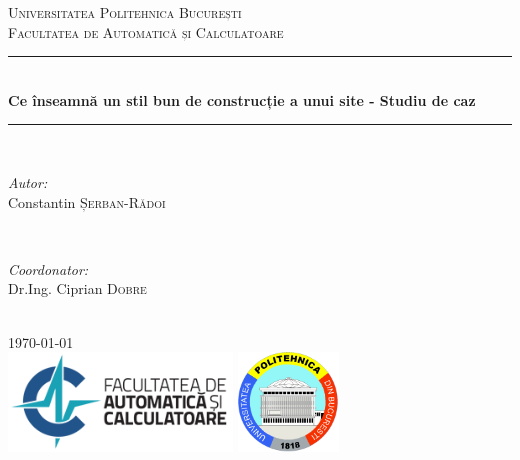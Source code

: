 \documentclass[12pt]{article} %
\begin{document}

\begin{titlepage}

\newcommand{\HRule}{\rule{\linewidth}{0.5mm}} %

\center %

\textsc{\LARGE Universitatea Politehnica București}\\[1.5cm] %
\textsc{\Large Facultatea de Automatică și Calculatoare}\\[0.5cm] %

\HRule \\[0.4cm]
{ \huge \bfseries Ce înseamnă un stil bun de construcție a unui site - Studiu de caz}\\[0.4cm] %
\HRule \\[1.5cm]

\begin{minipage}{0.4\textwidth}
\begin{flushleft} \large
\emph{Autor:}\\
Constantin \textsc{Șerban-Rădoi} %
\end{flushleft}
\end{minipage}
~
\begin{minipage}{0.4\textwidth}
\begin{flushright} \large
\emph{Coordonator:} \\
Dr.Ing. Ciprian \textsc{Dobre} %
\end{flushright}
\end{minipage}\\[4cm]

{\large \today}\\[3cm] %

\includegraphics[height=100px]{logo-acs-text} %
\includegraphics[height=100px]{logo-upb}

\vfill %

\end{titlepage}
\end{document}
